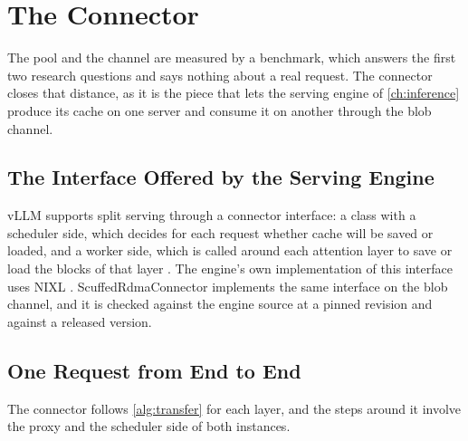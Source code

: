 \section{The Connector}
\label{sec:connector}

The pool and the channel are measured by a benchmark, which answers the
first two research questions and says nothing about a real request. The
connector closes that distance, as it is the piece that lets the serving
engine of \cref{ch:inference} produce its cache on one server and consume it
on another through the blob channel.

\subsection{The Interface Offered by the Serving Engine}

vLLM supports split serving through a connector interface: a class with a
scheduler side, which decides for each request whether cache will be saved or
loaded, and a worker side, which is called around each attention layer to
save or load the blocks of that layer \citep{vllm_disagg}. The engine's own
implementation of this interface uses NIXL \citep{nixl}.
ScuffedRdmaConnector implements the same interface on the blob channel, and
it is checked against the engine source at a pinned revision and against a
released version.

\subsection{One Request from End to End}

The connector follows \cref{alg:transfer} for each layer, and the steps
around it involve the proxy and the scheduler side of both instances.

